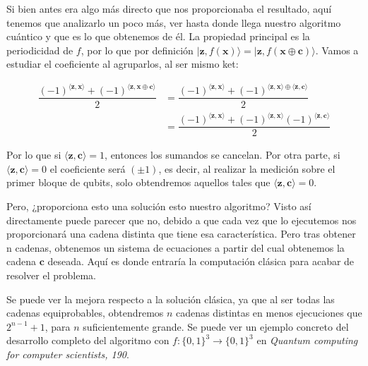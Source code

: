  \vspace{5pt}

 Si bien antes era algo más directo que nos proporcionaba el resultado, aquí tenemos que analizarlo un poco más, ver hasta donde llega nuestro algoritmo cuántico y que es lo que obtenemos de él. La propiedad principal es la periodicidad de $f$, por lo que por definición  $|\mathbf{z},f(\mathbf{x})\rangle=|\mathbf{z},f(\mathbf{x}\oplus \mathbf{c})\rangle$. Vamos a estudiar el coeficiente al agruparlos, al ser mismo ket:

 \begin{equation}
    \begin{split}
     \dfrac{(-1)^{\langle \mathbf{z},\mathbf{x}\rangle}+(-1)^{\langle \mathbf{z},\mathbf{x}\oplus \mathbf{c}\rangle}}{2} &= \dfrac{(-1)^{\langle \mathbf{z},\mathbf{x}\rangle}+(-1)^{\langle \mathbf{z},\mathbf{x}\rangle \oplus \langle \mathbf{z}, \mathbf{c}\rangle}}{2} \\ &= \dfrac{(-1)^{\langle \mathbf{z},\mathbf{x}\rangle}+(-1)^{\langle \mathbf{z},\mathbf{x}\rangle}(-1)^{\langle \mathbf{z}, \mathbf{c}\rangle}}{2}
    \end{split}
 \end{equation}

 Por lo que si $\langle \mathbf{z}, \mathbf{c}\rangle=1$, entonces los sumandos se cancelan. Por otra parte, si $\langle \mathbf{z}, \mathbf{c}\rangle=0$ el coeficiente será $(\pm 1)$, es decir, al realizar la medición sobre el primer bloque de qubits, solo obtendremos aquellos tales que $\langle \mathbf{z}, \mathbf{c}\rangle=0$.

 \vspace{8pt}

 Pero, ¿proporciona esto una solución esto nuestro algoritmo? Visto así directamente puede parecer que no, debido a que cada vez que lo ejecutemos nos proporcionará una cadena distinta que tiene esa característica. Pero tras obtener n cadenas, obtenemos un sistema de ecuaciones a partir del cual obtenemos la cadena $\mathbf{c}$ deseada. Aquí es donde entraría la computación clásica para acabar de resolver el problema.

 \vspace{8pt}

 Se puede ver la mejora respecto a la solución clásica, ya que al ser todas las cadenas equiprobables, obtendremos $n$ cadenas distintas en menos ejecuciones que $2^{n-1}+1$, para $n$ suficientemente grande. Se puede ver un ejemplo concreto del desarrollo completo del algoritmo con $f:\{0,1\}^{3} \rightarrow\{0,1\}^{3}$ en \textit{Quantum computing for computer scientists, 190}\cite{B:QuantumScientist:2008}.

